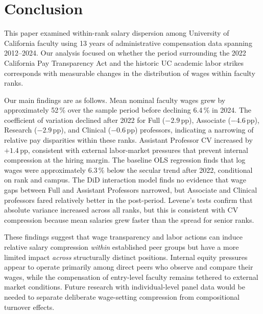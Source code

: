 \documentclass[12pt]{article}
\begin{document}
\section{Conclusion}
\label{sec:conclusion}

This paper examined within-rank salary dispersion among University of
California faculty using 13 years of administrative compensation data
spanning 2012--2024. Our analysis focused on whether the period
surrounding the 2022 California Pay Transparency Act and the historic UC
academic labor strikes corresponds with measurable changes in the
distribution of wages within faculty ranks.

Our main findings are as follows. Mean nominal faculty wages grew by
approximately 52\,\% over the sample period before declining 6.4\,\% in
2024. The coefficient of variation declined after 2022 for Full
($-2.9$\,pp), Associate ($-4.6$\,pp), Research ($-2.9$\,pp), and
Clinical ($-0.6$\,pp) professors, indicating a narrowing of relative pay
disparities within these ranks. Assistant Professor CV increased by
$+1.4$\,pp, consistent with external labor-market pressures that prevent
internal compression at the hiring margin. The baseline OLS regression
finds that log wages were approximately 6.3\,\% below the secular trend
after 2022, conditional on rank and campus. The DiD interaction model
finds no evidence that wage gaps between Full and Assistant Professors
narrowed, but Associate and Clinical professors fared relatively better
in the post-period. Levene's tests confirm that absolute variance
increased across all ranks, but this is consistent with CV compression
because mean salaries grew faster than the spread for senior ranks.

These findings suggest that wage transparency and labor actions can
induce relative salary compression \emph{within} established peer groups
but have a more limited impact \emph{across} structurally distinct
positions. Internal equity pressures appear to operate primarily among
direct peers who observe and compare their wages, while the
compensation of entry-level faculty remains tethered to external market
conditions. Future research with individual-level panel data would be
needed to separate deliberate wage-setting compression from compositional
turnover effects.
\end{document}
